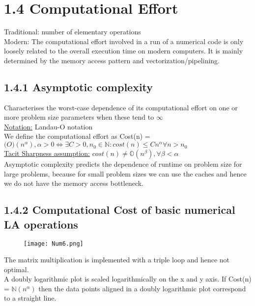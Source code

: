 \documentclass[8pt]{extreport}
\begin{document}
\section{1.4 Computational Effort} 

Traditional: number of elementary operations\\

Modern: The computational effort involved in a run of a numerical code is only loosely related to the overall execution time on modern computers. It is mainly determined by the memory access pattern and vectorization/pipelining.

\subsection{1.4.1 Asymptotic complexity}

Characterises the worst-case dependence of its computational effort on one or more problem size parameters when these tend to $\infty$\\

\underline{Notation:} Landau-O notation\\

We define the computational effort as Cost(n) = $\mathcal(O)(n^{\alpha}), \alpha > 0 \iff \exists C >0, n_0 \in \mathbb{N}: cost(n)\leq Cn^{\alpha} \forall n > n_0$\\

\underline{Tacit Sharpness assumption:} $cost(n) \neq \mathbb{O}(n^{\beta}), \forall \beta < \alpha$\\

Asymptotic complexity predicts the dependence of runtime on problem size for large problems, because for small problem sizes we can use the caches and hence we do not have the memory access bottleneck. 

\subsection{1.4.2 Computational Cost of basic numerical LA operations}
\begin{figure}[H]
\centering
\texttt{[image: Num6.png]}
\end{figure}

The matrix multiplication is implemented with a triple loop and hence not optimal.\\

A doubly logarithmic plot is scaled logarithmically on the x and y axis. If Cost(n) = $ \mathbb{N}(n^{\alpha})$ then the data points aligned in a doubly logarithmic plot correspond to a straight line.  
\end{document}

